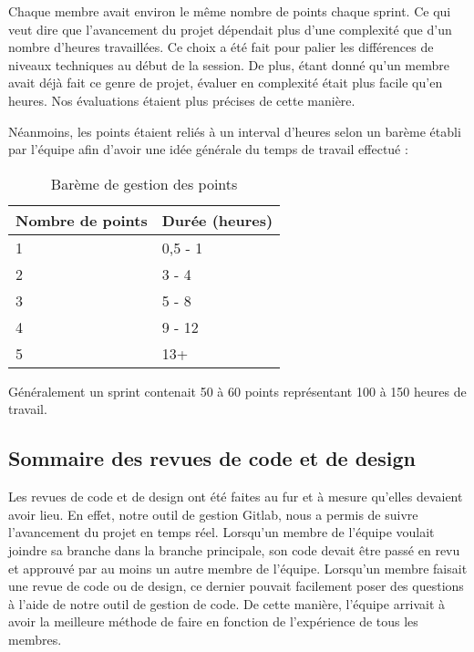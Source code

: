    Chaque membre avait environ le même nombre de points chaque sprint. Ce qui veut dire que l'avancement du projet dépendait plus d'une complexité que d'un nombre d'heures travaillées. Ce choix a été fait pour palier les différences de niveaux techniques au début de la session. De plus, étant donné qu'un membre avait déjà fait ce genre de projet, évaluer en complexité était plus facile qu'en heures. Nos évaluations étaient plus précises de cette manière.

    Néanmoins, les points étaient reliés à un interval d'heures selon un barème établi par l'équipe afin d'avoir une idée générale du temps de travail effectué :
    
    \begin{table}[hp]
        \centering
        \caption{Barème de gestion des points}
        \begingroup
        \renewcommand{\arraystretch}{1}
        \begin{tabular}{ll}
            \hline
            \bf Nombre de points & \bf Durée (heures) \\
            \hline
            \hline
            1 & 0,5 - 1 \\
            2 & 3 - 4 \\
            3 & 5 - 8 \\
            4 & 9 - 12 \\
            5 & 13+ \\
            \hline
        \end{tabular}
        \endgroup
        \label{tab.bareme}
    \end{table}
    
    Généralement un sprint contenait 50 à 60 points représentant 100 à 150 heures de travail.

    \subsection{Sommaire des revues de code et de design}
    Les revues de code et de design ont été faites au fur et à mesure qu'elles devaient avoir lieu. En effet, notre outil de gestion Gitlab, nous a permis de suivre l'avancement du projet en temps réel. Lorsqu'un membre de l'équipe voulait joindre sa branche dans la branche principale, son code devait être passé en revu et approuvé par au moins un autre membre de l'équipe. Lorsqu'un membre faisait une revue de code ou de design, ce dernier pouvait facilement poser des questions à l'aide de notre outil de gestion de code. De cette manière, l'équipe arrivait à avoir la meilleure méthode de faire en fonction de l'expérience de tous les membres.
 
